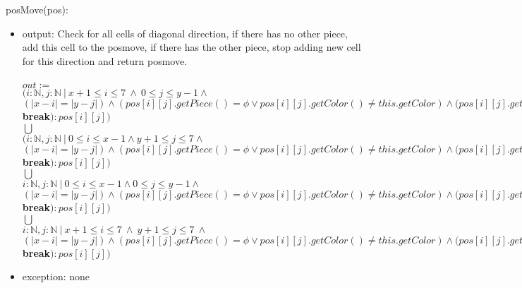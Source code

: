 \documentclass[12pt]{article}
\begin{document}
\noindent posMove(pos):
\begin{itemize}
\item output: Check for all cells of diagonal direction, if there has no other piece, add this cell to the posmove, if there has the other piece, stop adding new cell for this direction and return posmove.\\
\\
$out :=$\\
$(i : \mathbb{N}, j : \mathbb{N}\ |\  x + 1 \leq i \leq 7 \ \wedge \  0 \leq j \leq y - 1 \wedge $ \\
$ (|x-i| = |y-j|) \wedge (pos[i][j].getPiece() = \phi \vee pos[i][j].getColor() \ne this.getColor) \wedge (pos[i][j].getColor() = this.getColor() \Rightarrow$ \textbf{break}$) : pos[i][j])$\\
$\bigcup$ \\
$(i : \mathbb{N}, j : \mathbb{N}\ |\ 0 \leq i \leq x - 1 \wedge y + 1 \leq j \leq 7 \wedge $ \\ 
$(|x-i| = |y-j|) \wedge (pos[i][j].getPiece() = \phi \vee pos[i][j].getColor() \ne this.getColor) \wedge (pos[i][j].getColor() = this.getColor() \Rightarrow$ \textbf{break}$) : pos[i][j])$\\
$\bigcup$ \\
$i : \mathbb{N}, j : \mathbb{N}\ |\ 0 \leq i \leq x - 1 \wedge 0 \leq j \leq y - 1 \wedge \  $ \\ 
$(|x-i| = |y-j|) \wedge (pos[i][j].getPiece() = \phi \vee pos[i][j].getColor() \ne this.getColor) \wedge (pos[i][j].getColor() = this.getColor() \Rightarrow$ \textbf{break}$) : pos[i][j])$\\
$\bigcup$ \\
$i : \mathbb{N}, j : \mathbb{N}\ |\ x + 1 \leq i \leq 7\ \wedge\  y + 1 \leq j \leq 7 \ \wedge \  $ \\ 
$(|x-i| = |y-j|) \wedge (pos[i][j].getPiece() = \phi \vee pos[i][j].getColor() \ne this.getColor) \wedge (pos[i][j].getColor() = this.getColor() \Rightarrow$ \textbf{break}$) : pos[i][j])$
\item exception: none
\end{itemize}

\newpage
\end{document}
